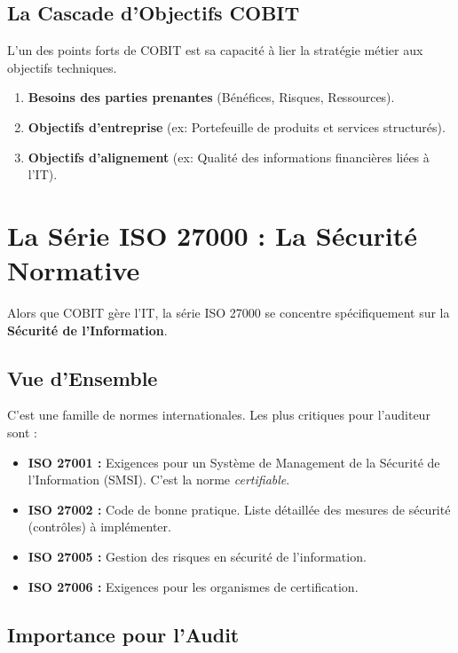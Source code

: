 \subsection{La Cascade d'Objectifs COBIT}
L'un des points forts de COBIT est sa capacité à lier la stratégie métier aux objectifs techniques. 
\begin{enumerate}
    \item \textbf{Besoins des parties prenantes} (Bénéfices, Risques, Ressources).
    \item \textbf{Objectifs d'entreprise} (ex: Portefeuille de produits et services structurés).
    \item \textbf{Objectifs d'alignement} (ex: Qualité des informations financières liées à l'IT).
\end{enumerate}
\section{La Série ISO 27000 : La Sécurité Normative}

Alors que COBIT gère l'IT, la série ISO 27000 se concentre spécifiquement sur la \textbf{Sécurité de l'Information}.

\subsection{Vue d'Ensemble}

C'est une famille de normes internationales. Les plus critiques pour l'auditeur sont :

\begin{itemize}
    \item \textbf{ISO 27001 :} Exigences pour un Système de Management de la Sécurité de l'Information (SMSI). C'est la norme \textit{certifiable}.
    \item \textbf{ISO 27002 :} Code de bonne pratique. Liste détaillée des mesures de sécurité (contrôles) à implémenter.
    \item \textbf{ISO 27005 :} Gestion des risques en sécurité de l'information.
    \item \textbf{ISO 27006 :} Exigences pour les organismes de certification.
\end{itemize}

\subsection{Importance pour l'Audit}


